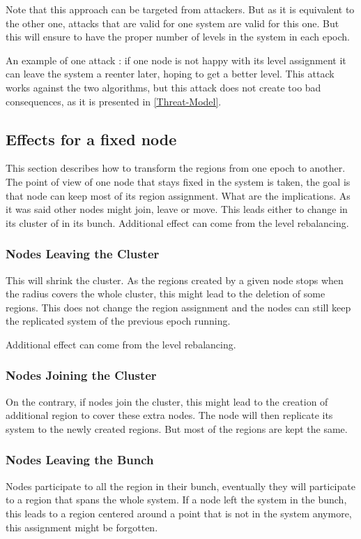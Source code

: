 \documentclass[a4paper,11pt,oneside]{report}
\begin{document}
Note that this approach can be targeted from attackers. But as it is equivalent
to the other one, attacks that are valid for one system are valid for this one.
But this will ensure to have the proper number of levels in the system in each
epoch.

An example of one attack : if one node is not happy with its level assignment
it can leave the system a reenter later, hoping to get a better level. This
attack works against the two algorithms, but this attack does not create too
bad consequences, as it is presented in \ref{Threat-Model}.



\subsection{Effects for a fixed node}
This section describes how to transform the regions from one epoch to another.
The point of view of one node that stays fixed in the system is taken, the goal
is that node can keep most of its region assignment.  What are the
implications. As it was said other nodes might join, leave or move. This leads
either to change in its cluster of in its bunch. 
Additional effect can come from the level rebalancing. 

\subsubsection{Nodes Leaving the Cluster} 
This will shrink the cluster. As the regions created by a given node stops when
the radius covers the whole cluster, this might lead to the deletion of some
regions. This does not change the
region assignment and the nodes can still keep the replicated system of the
previous epoch running.

Additional effect can come from the level rebalancing. 

\subsubsection{Nodes Joining the Cluster} 
On the contrary, if nodes join the cluster, this might lead to the creation of
additional region to cover these extra nodes. The node will then replicate its
system to the newly created regions. But most of the regions are kept the same.

\subsubsection{Nodes Leaving the Bunch} 
Nodes participate to all the region in their bunch, eventually they will
participate to a region that spans the whole system. If a node left the system
in the bunch,  this leads to a region centered around a point that is not in
the system anymore, this assignment might be forgotten. 
\end{document}
